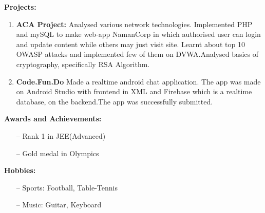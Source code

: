 \documentclass{article}
\begin{document}
\noindent
\textbf{Projects:}
\begin{enumerate}
    \item \textbf{ACA Project:} Analysed various network technologies. Implemented PHP and mySQL to make web-app NamanCorp in which authorised user can login and update content while others may just visit site. Learnt about top 10 OWASP attacks and implemented few of them on DVWA.Analysed basics of cryptography, specifically RSA Algorithm.
    \item \textbf{Code.Fun.Do} Made a realtime android chat application. The app was made on Android Studio with frontend in XML and Firebase which is a realtime database, on the backend.The app was successfully submitted.
\end{enumerate}

\noindent
\textbf{Awards and Achievements:}
\begin{itemize}
    \item [--] Rank 1 in JEE(Advanced)
    \item [--] Gold medal in Olympics
\end{itemize}

\noindent
\textbf{Hobbies:}
\begin{itemize}
    \item [--] Sports: Football, Table-Tennis
    \item [--] Music: Guitar, Keyboard
\end{itemize}
\end{document}
